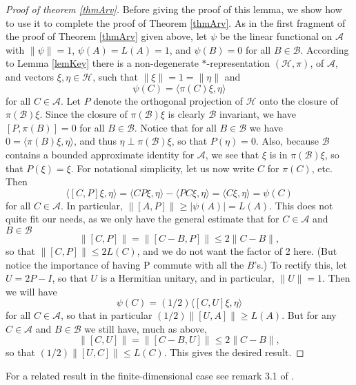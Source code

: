 \documentclass[12pt]{amsart}
\newcommand{\<}{\langle}
\renewcommand{\>}{\rangle}
\newcommand{\cA}{{\mathcal A}}
\newcommand{\cB}{{\mathcal B}}
\newcommand{\cH}{{\mathcal H}}
\theoremstyle{definition}   %
\begin{document}
\begin{proof}[Proof of theorem \ref{thmArv}]
Before giving the proof of this lemma, we show how to use it to 
complete the proof of Theorem \ref{thmArv}. As in the first fragment
of the proof of Theorem \ref{thmArv} given above, let $\psi$
be the linear functional on $\cA$ with $\|\psi\| = 1$, $\psi(A) = L(A) = 1$,
and $\psi(B) = 0$ for all $B \in \cB$. According to Lemma \ref{lemKey}
there is a non-degenerate $*$-representation  $(\cH, \pi)$, of $\cA$, 
and vectors $\xi, \eta \in \cH$,
such that $\|\xi\| = 1 = \|\eta\|$ and
\[
\psi(C) = \<\pi(C)\xi, \eta\>
\]
for all $C \in \cA$. Let $P$ denote the orthogonal projection
of $\cH$ onto the closure of $\pi(\cB)\xi$. Since the closure of 
 $\pi(\cB)\xi$ is clearly $\cB$ invariant, we have $[P, \pi(B)] = 0$
 for all $B \in \cB$. Notice that for all $B \in \cB$ we have
$0 = \<\pi(B)\xi, \eta\>$, and thus $\eta \perp \pi(\cB)\xi$, so that
 $P(\eta) = 0$. Also, because $\cB$ contains a bounded 
 approximate identity for $\cA$, we see that $\xi$
 is in $\pi(\cB)\xi$, so that $P(\xi) = \xi$. 
 For notational simplicity, let us now write $C$ for $\pi(C)$, etc. Then
 \[
 \<[C, P]\xi, \eta\> = \<CP\xi, \eta\> - \<PC\xi, \eta\> = \<C\xi, \eta\> = \psi(C)  
 \]
 for all $C \in \cA$. In particular, $\|[A, P]\| \geq |\psi(A)| = L(A)$. 
 This does not quite fit our needs, as
 we only have the general estimate that for $C \in \cA$ and $B \in \cB$ 
 \[
 \|[C, P]\| = \|[C-B, P]\| \leq 2\|C-B\|   ,
 \]
so that $\|[C, P]\| \leq 2L(C)$, and we do not want the factor of 2 here.
(But notice the importance of having P commute with all the $B$'s.)
To rectify this, let $U = 2P - I$, so that $U$ is a Hermitian unitary, and
in particular, $\|U\| = 1$. Then we will have
\[
\psi(C) = (1/2)\<[C, U]\xi, \eta\>   
\]
for all $C \in \cA$, 
so that in particular $(1/2)\|[U, A]\| \geq L(A)$. But for any $C \in \cA$ and $B \in \cB$
we still have, much as above,
\[
\|[C, U]\| = \|[C-B, U]\| \leq 2\|C-B\|,
\]
so that $(1/2)\|[U, C]\| \leq L(C)$. This gives the desired result.
\end{proof}

For a related result in the finite-dimensional case see remark 3.1
of \cite{BhS}.
\end{document}
